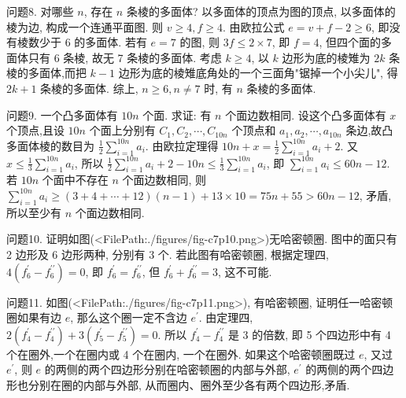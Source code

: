 问题8. 对哪些 $n$, 存在 $n$ 条棱的多面体?
以多面体的顶点为图的顶点, 以多面体的棱为边, 构成一个连通平面图.
则 $v \geqslant 4, f \geqslant 4$. 由欧拉公式 $e=v+f-2 \geqslant 6$, 即没有棱数少于 6 的多面体.
若有 $e=7$ 的图, 则 $3 f \leqslant 2 \times 7$, 即 $f=4$, 但四个面的多面体只有 6 条棱, 故无 7 条棱的多面体.
考虑 $k \geqslant 4$, 以 $k$ 边形为底的棱雉为 $2 k$ 条棱的多面体,而把 $k-1$ 边形为底的棱雉底角处的一个三面角"锯掉一个小尖儿", 得 $2 k+1$ 条棱的多面体.
综上, $n \geqslant 6, n \neq 7$ 时, 有 $n$ 条棱的多面体.



问题9. 一个凸多面体有 $10 n$ 个面.
求证: 有 $n$ 个面边数相同.
设这个凸多面体有 $x$ 个顶点,且设 $10 n$ 个面上分别有 $C_1, C_2, \cdots, C_{10 n}$ 个顶点和 $a_1, a_2, \cdots, a_{10 n}$ 条边,故凸多面体棱的数目为 $\frac{1}{2} \sum_{i=1}^{10 n} a_i$. 由欧拉定理得 $10 n+x=\frac{1}{2} \sum_{i=1}^{10 n} a_i+2$. 又 $x \leqslant \frac{1}{3} \sum_{i=1}^{10 n} a_i$, 所以 $\frac{1}{2} \sum_{i=1}^{10 n} a_i+2-10 n \leqslant \frac{1}{3} \sum_{i=1}^{10 n} a_i$, 即 $\sum_{i=1}^{10 n} a_i \leqslant 60 n-12$.
若 $10 n$ 个面中不存在 $n$ 个面边数相同, 则 $\sum_{i=1}^{10 n} a_i \geqslant(3+4+\cdots+12) (n-1)+13 \times 10=75 n+55>60 n-12$, 矛盾, 所以至少有 $n$ 个面边数相同.



问题10. 证明如图(<FilePath:./figures/fig-c7p10.png>)无哈密顿圈.
图中的面只有 2 边形及 6 边形两种, 分别有 3 个.
若此图有哈密顿圈, 根据定理四, $4\left(f_6^{\prime}-f_6^{\prime \prime}\right)=0$, 即 $f_6^{\prime}=f_6^{\prime \prime}$, 但 $f_6^{\prime}+f_6^{\prime \prime}=3$, 这不可能.



问题11. 如图(<FilePath:./figures/fig-c7p11.png>), 有哈密顿圈, 证明任一哈密顿圈如果有边 $e$, 那么这个圈一定不含边 $e^{\prime}$.
由定理四, $2\left(f_4^{\prime}-f_4^{\prime \prime}\right)+3\left(f_5^{\prime}-f_5^{\prime \prime}\right)=0$. 所以 $f_4^{\prime}-f_4^{\prime \prime}$ 是 3 的倍数, 即 5 个四边形中有 4 个在圈外,一个在圈内或 4 个在圈内, 一个在圈外.
如果这个哈密顿圈既过 $e$, 又过 $e^{\prime}$, 则 $e$ 的两侧的两个四边形分别在哈密顿圈的内部与外部, $e^{\prime}$ 的两侧的两个四边形也分别在圈的内部与外部, 从而圈内、圈外至少各有两个四边形,矛盾.



